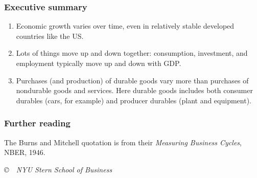\documentclass[letterpaper,12pt]{article}
\begin{document}
\subsubsection*{Executive summary}

\begin{enumerate}
\item Economic growth varies over time, 
even in relatively stable developed countries like the US.  

\item Lots of things move up and down together:  
consumption, investment, and employment typically move up and down
with GDP.  

\item Purchases (and production) of durable goods vary more 
than purchases of nondurable goods and services. 
Here durable goods includes both consumer durables 
(cars, for example) and producer durables 
(plant and equipment).  

\end{enumerate}

\subsubsection*{Further reading}

The Burns and Mitchell quotation is from their 
{\it Measuring Business Cycles\/}, NBER, 1946.


%


\vfill \centerline{\it \copyright \ \number\year \ NYU Stern
School of Business}
\end{document}
